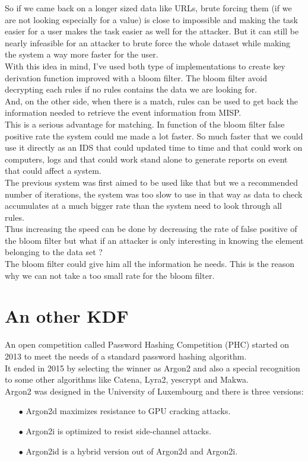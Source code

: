 \documentclass{eplmastersthesis}
\begin{document}
So if we came back on a longer sized data like URLs, brute forcing them (if we are not looking especially for a value) is close to impossible and making the task easier for a user makes the task easier as well for the attacker. But it can still be nearly infeasible for an attacker to brute force the whole dataset while making the system a way more faster for the user.\\

With this idea in mind, I've used both type of implementations to create key derivation function improved with a bloom filter. The bloom filter avoid decrypting each rules if no rules contains the data we are looking for. \\
And, on the other side, when there is a match, rules can be used to get back the information needed to retrieve the event information from MISP. \\

This is a serious advantage for matching. In function of the bloom filter false positive rate the system could me made a lot faster. So much faster that we could use it directly as an IDS that could updated time to time and that could work on computers, logs and that could work stand alone to generate reports on event that could affect a system.\\
The previous system was first aimed to be used like that but we a recommended number of iterations, the system was too slow to use in that way as data to check accumulates at a much bigger rate than the system need to look through all rules.\\

Thus increasing the speed can be done by decreasing the rate of false positive of the bloom filter but what if an attacker is only interesting in knowing the element belonging to the data set ?\\
The bloom filter could give him all the information he needs. This is the reason why we can not take a too small rate for the bloom filter.\\


\section{An other KDF}
An open competition called Password Hashing Competition (PHC) started on 2013 to meet the needs of a standard password hashing algorithm.\\ 
It ended in 2015 by selecting the winner as Argon2 and also a special recognition to some other algorithms like Catena, Lyra2, yescrypt and Makwa.\\
Argon2 was designed in the University of Luxembourg and there is three versions:
\begin{itemize}
\item[$\bullet$] Argon2d maximizes resistance to GPU cracking attacks.
\item[$\bullet$] Argon2i is optimized to resist side-channel attacks.
\item[$\bullet$] Argon2id is a hybrid version out of Argon2d and Argon2i.
\end{itemize}
\end{document}
